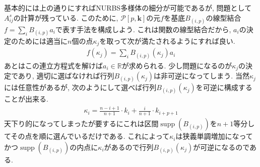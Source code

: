 \documentclass{jsarticle}
\newcommand\setR{\mathbb{R}}
\newcommand\Pare[1]{\left(#1\right)}
\DeclareMathOperator{\supp}{supp}
\theoremstyle{definition}%
\newtheorem{thm}{定理}
\begin{document}
基本的には上の通りにすればNURBS多様体の細分が可能であるが, 問題として$A^s_{ij}$の計算が残っている.
このために, $\mathcal{P}[p,\bm{k}]$の元$f$を基底$B_{(i,p)}$の線型結合$f=\sum_iB_{(i,p)}a_i$で表す手法を構成しよう.
これは関数の線型結合だから, $a_i$の決定のためには適当に$n$個の点$\kappa_j$を取って次が満たされるようにすれば良い.
\begin{align}
    f(\kappa_j)=\sum_{i}B_{(i,p)}(\kappa_j)a_i
\end{align}
あとはこの連立方程式を解けば$a_i\in\setR$が求められる.
少し問題になるのが$\kappa_j$の決定であり, 適切に選ばなければ行列$B_{(i,p)}(\kappa_j)$は非可逆になってしまう.
当然$\kappa_j$には任意性があるが, 次のようにして選べば行列$B_{(i,p)}(\kappa_j)$を可逆に構成することが出来る.
\begin{align}
    \label{Eqn601}
    \kappa_i={\frac{n-i+1}{n+1}\cdot k_i+\frac{i}{n+1}\cdot k_{i+p+1}}
\end{align}
天下り的になってしまったが要するにこれは区間$\supp(B_{(i,p)})$を$n+1$等分してその点を順に選んでいるだけである.
これによって$\kappa_i$は狭義単調増加になってかつ$\supp(B_{(i,p)})$の内点に$\kappa_i$があるので行列$B_{(i,p)}(\kappa_j)$が可逆になるのである.
%

\newpage
\end{document}
